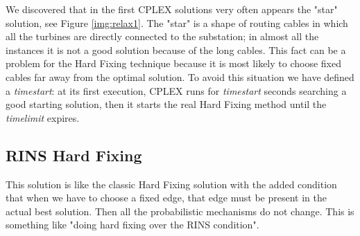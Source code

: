 We discovered that in the first \textsc{CPLEX} solutions very often appears the "star" solution, see Figure \ref{img:relax1}. The "star" is a shape of routing cables in which all the turbines are directly connected to the substation; in almost all the instances it is not a good solution because of the long cables. This fact can be a problem for the Hard Fixing technique because it is most likely to choose fixed cables far away from the optimal solution. To avoid this situation we have defined a \textit{timestart}: at its first execution, \textsc{CPLEX} runs for \textit{timestart} seconds searching a good starting solution, then it starts the real Hard Fixing method until the \textit{timelimit} expires. 

\subsection{RINS Hard Fixing}
This solution is like the classic Hard Fixing solution with the added condition that when we have to choose a fixed edge, that edge must be present in the actual best solution. Then all the probabilistic mechanisms do not change. This is something like "doing hard fixing over the RINS condition". 


